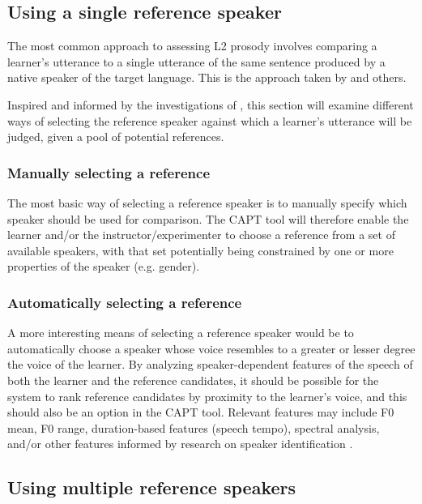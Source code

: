 	\subsection{Using a single reference speaker}
	\label{sec:compare:single}
	
	The most common approach to assessing L2 prosody involves comparing a learner's utterance to a single utterance of the same sentence produced by a native speaker of the target language. This is the approach taken by \textcite{Bonneau2011} and others.
	
	 Inspired and informed by the investigations of \textcite{Probst2002}, this section will examine different ways of selecting the reference speaker against which a learner's utterance will be judged, given a pool of potential references. 
	
		\subsubsection{Manually selecting a reference}
		\label{sec:compare:single:manual}
		
		The most basic way of selecting a reference speaker is to manually specify which speaker should be used for comparison. The CAPT tool will therefore enable  the learner and/or the instructor/experimenter to choose a reference from a set of available speakers, with that set potentially being constrained by one or more properties of the speaker (e.g. gender).
		
		\subsubsection{Automatically selecting a reference}
		\label{sec:compare:single:auto}
		
		A more interesting means of selecting a reference speaker would be to automatically choose a speaker whose voice resembles to a greater or lesser degree the voice of the learner. By analyzing speaker-dependent features of the speech of both the learner and the reference candidates, it should be possible for the system to rank reference candidates by proximity to the learner's voice, and this should also be an option in the CAPT tool. Relevant features may include F0 mean, F0 range, duration-based features (speech tempo), spectral analysis, and/or other features informed by research on speaker identification \citep[etc.]{Shriberg2005,Reynolds1995}.
		
	\subsection{Using multiple reference speakers}
	\label{sec:compare:multi}
	

